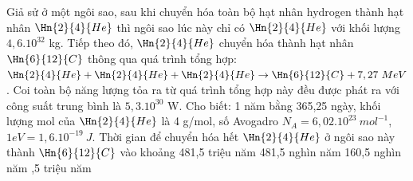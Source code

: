 \begin{vidu}%
 Giả sử ở một ngôi sao, sau khi chuyển hóa toàn bộ hạt nhân hydrogen thành hạt nhân $\Hn{2}{4}{He}$ thì ngôi sao lúc này chỉ có $\Hn{2}{4}{He}$ với khối lượng $4,6.10^{32}$ kg. Tiếp theo đó, $\Hn{2}{4}{He}$ chuyển hóa thành hạt nhân $\Hn{6}{12}{C}$ thông qua quá trình tổng hợp: $\Hn{2}{4}{He}+\Hn{2}{4}{He}+\Hn{2}{4}{He}\to \Hn{6}{12}{C}+7,27 \ MeV$. Coi toàn bộ năng lượng tỏa ra từ quá trình tổng hợp này đều được phát ra với công suất trung bình là $5,3.10^{30}$ W. Cho biết: 1 năm bằng 365,25 ngày, khối lượng mol của $\Hn{2}{4}{He}$ là 4 g/mol, số Avogadro $N_A = 6,02.10^{23}\ mol^{-1}$, $1eV=1,6.10^{-19}\ J$. Thời gian để chuyển hóa hết $\Hn{2}{4}{He}$ ở ngôi sao này thành $\Hn{6}{12}{C}$ vào khoảng
\motcot
{481,5 triệu năm}
{481,5 nghìn năm}
{160,5 nghìn năm}
{,5 triệu năm}
\end{vidu}

